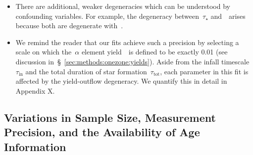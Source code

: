 \documentclass[ms.tex]{subfiles}
\begin{document}
\begin{itemize}
\begin{itemize}
	\end{itemize}

	\item There are additional, weaker degeneracies which can be understood
	by confounding variables.
	For example, the degeneracy between~$\tau_\star$ and~\yfeia~arises because
	both are degenerate with~\yfecc.

	\item We remind the reader that our fits achieve such a precision by
	selecting a scale on which the~$\alpha$ element yield~\yacc~is defined to
	be exactly 0.01 (see discussion in~\S~\ref{sec:methods:onezone:yields}).
	Aside from the infall timescale~$\tau_\text{in}$ and the total duration of
	star formation~$\tau_\text{tot}$, each parameter in this fit is affected by
	the yield-outflow degeneracy.
	We quantify this in detail in Appendix X.

\end{itemize}

\subsection{Variations in Sample Size, Measurement Precision, and the
Availability of Age Information}
\label{sec:mocks:variations}


\end{document}
